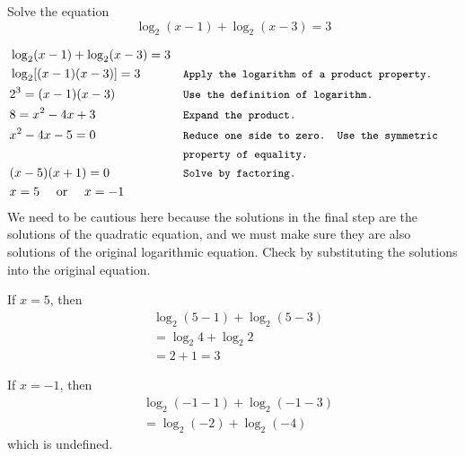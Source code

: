 \begin{example} Solve the equation
    \begin{equation*}
\log _2(x-1)+\log _2(x-3)=3
\end{equation*}

\newpage

\begin{solution}

\begin{align*}
& \log _2(x-1)+\log _2(x-3)=3  \\
& \log _2[(x-1)(x-3)]=3 && \texttt{\small Apply the logarithm of a product property.} \\
& 2^3=(x-1)(x-3) && \texttt{\small Use the definition of logarithm.} \\
& 8=x^2-4 x+3 && \texttt{\small Expand the product.}\\
& x^2-4 x-5=0 && \texttt{\small Reduce one side to zero. Use the symmetric }\\
&\vspace{-0.2cm}   && \texttt{\small property of equality.} \\
& (x-5)(x+1)=0 && \texttt{\small Solve by factoring.} \\
& x=5 \quad \text{ or } \quad x=-1
\end{align*}
We need to be cautious here because the solutions in the final step are the solutions of the quadratic equation, and we must make sure they are also solutions of the original logarithmic equation. Check by substituting the solutions into the original equation.

\begin{minipage}[t]{0.45\textwidth}
If $x=5$, then
\[
\begin{aligned}
& \log _2(5-1)+\log _2(5-3) \\
& =\log _2 4+\log _2 2 \\
& =2+1=3
\end{aligned}
\]
\end{minipage}%
\hfill
\begin{minipage}[t]{0.45\textwidth}
If $x=-1$, then
\[
\begin{aligned}
& \log _2(-1-1)+\log _2(-1-3) \\
& =\log _2(-2)+\log _2(-4)
\end{aligned}
\]
which is undefined.
\end{minipage}

\end{solution}

\end{example}

